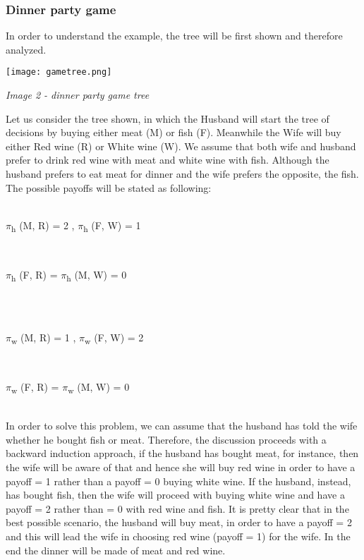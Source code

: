 \documentclass[conference]{IEEEtran}
\begin{document}
\subsubsection{Dinner party game}
In order to understand the example, the tree will be first shown and therefore analyzed.\\
\centerline{\texttt{[image: gametree.png]}}  
\centerline{\textit{Image 2 - dinner party game tree}}
Let us consider the tree shown, in which the Husband will start the tree of decisions by buying either meat (M) or fish (F). Meanwhile the Wife will buy either Red wine (R) or White wine (W). We assume that both wife and husband prefer to drink red wine with meat and white wine with fish. Although the husband prefers to eat meat for dinner and the wife prefers the opposite, the fish. The possible payoffs will be stated as following:\\ \\
\centerline{$\pi$\textsubscript{h} (M, R) = 2 ,  $\pi$\textsubscript{h} (F, W) = 1} \\
\centerline{$\pi$\textsubscript{h} (F, R) = $\pi$\textsubscript{h} (M, W) = 0} \\\\
\centerline{$\pi$\textsubscript{w} (M, R) = 1 ,  $\pi$\textsubscript{w} (F, W) = 2} \\
\centerline{$\pi$\textsubscript{w} (F, R) = $\pi$\textsubscript{w} (M, W) = 0}
\\

In order to solve this problem, we can assume that the husband has told the wife whether he bought fish or meat. Therefore, the discussion proceeds with a backward induction approach, if the husband has bought meat, for instance, then the wife will be aware of that and hence she will buy red wine in order to have a payoff = 1 rather than a payoff = 0 buying white wine. If the husband, instead, has bought fish, then the wife will proceed with buying white wine and have a payoff = 2 rather than = 0 with red wine and fish.
It is pretty clear that in the best possible scenario, the husband will buy meat, in order to have a payoff = 2 and this will lead the wife in choosing red wine (payoff = 1) for the wife. In the end the dinner will be made of meat and red wine.
\end{document}
